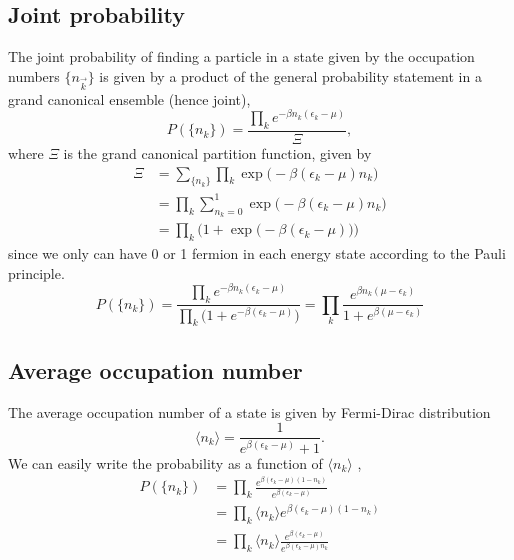 \documentclass[norsk,a4paper,12pt]{article}
\begin{document}
\subsection{Joint probability}
The joint probability of finding a particle in a state given by the occupation numbers $\{n_{\vec{k}}\}$ is given by a product of the general probability statement in a grand canonical ensemble (hence joint),
\begin{equation}
P(\{n_{k}\})=\frac{\prod_ke^{-\beta n_k(\epsilon_k-\mu)}}{\Xi},
\end{equation}
where $\Xi$ is the grand canonical partition function, given by
\begin{align}
\Xi&=\sum_{\{n_k\}}\prod_k\exp\big(-\beta(\epsilon_k-\mu)n_k\big)\\
&=\prod_k\sum_{n_k=0}^1\exp\big(-\beta(\epsilon_k-\mu)n_k\big)\\
&=\prod_k\Big(1+\exp\big(-\beta(\epsilon_k-\mu)\big)\Big)
\end{align}
since we only can have 0 or 1 fermion in each energy state according to the Pauli principle. 
\begin{equation}
P(\{n_{k}\})=\frac{\prod_ke^{-\beta n_k(\epsilon_k-\mu)}}{\prod_k\big(1+e^{-\beta(\epsilon_k-\mu)}\big)}=\prod_k\frac{e^{\beta n_k(\mu-\epsilon_k)}}{1+e^{\beta(\mu-\epsilon_k)}}
\end{equation}

\subsection{Average occupation number}
The average occupation number of a state is given by Fermi-Dirac distribution
\begin{equation}
\langle n_k\rangle = \frac{1}{e^{\beta(\epsilon_k-\mu)}+1}.
\end{equation}
We can easily write the probability as a function of $\langle n_k\rangle$ ,
\begin{align}
P(\{n_{k}\})&=\prod_k\frac{e^{\beta(\epsilon_k-\mu)(1-n_k)}}{e^{\beta(\epsilon_k-\mu)}}\\
&=\prod_k\langle n_k\rangle e^{\beta(\epsilon_k-\mu)(1-n_k)}\\
&=\prod_k\langle n_k\rangle \frac{e^{\beta(\epsilon_k-\mu)}}{e^{\beta(\epsilon_k-\mu)n_k}}
\end{align}
\end{document}
